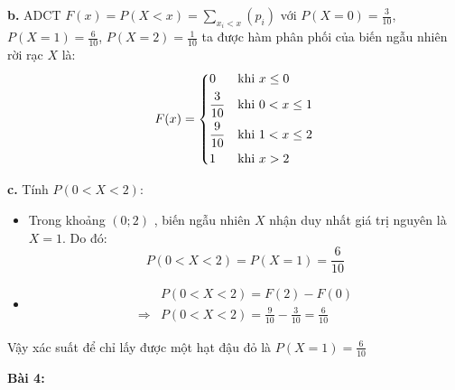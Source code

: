 \documentclass[12pt]{article}
\begin{document}
\begin{itemize}
    \textbf{b.} ADCT $F(x) = P(X < x) = \sum_{x_i < x} (p_i)$ với $ P(X=0)=\frac{3}{10}$, $P(X=1)=\frac{6}{10}$, $P(X=2)=\frac{1}{10}$ ta được hàm phân phối của biến ngẫu nhiên rời rạc $X$ là:
    \[ F(x) = \begin{dcases} 
      0 & \text{khi } x \le 0 \\ 
      \frac{3}{10} & \text{khi } 0 < x \le 1 \\ 
      \frac{9}{10} & \text{khi } 1 < x \le 2 \\ 
      1 & \text{khi } x > 2 
   \end{dcases} \]
    
    \textbf{c.} Tính $P(0 < X < 2)$:
    \begin{itemize}
        \item {} Trong khoảng $(0;2)$ , biến ngẫu nhiên $X$ nhận duy nhất giá trị nguyên là $X = 1$. Do đó:
        \[ P(0 < X < 2) = P(X = 1) = \frac{6}{10} \]
        \item {} 
        \begin{align*}
        & P(0 < X < 2) = F(2) - F(0) \\
        \Rightarrow & P(0 < X < 2) = \frac{9}{10} - \frac{3}{10} = \frac{6}{10}
        \end{align*}
    \end{itemize}

    Vậy xác suất để chỉ lấy được một hạt đậu đỏ là $P(X=1)=\frac{6}{10}$
\end{itemize}

\clearpage

\textbf{Bài 4:}
\end{document}
